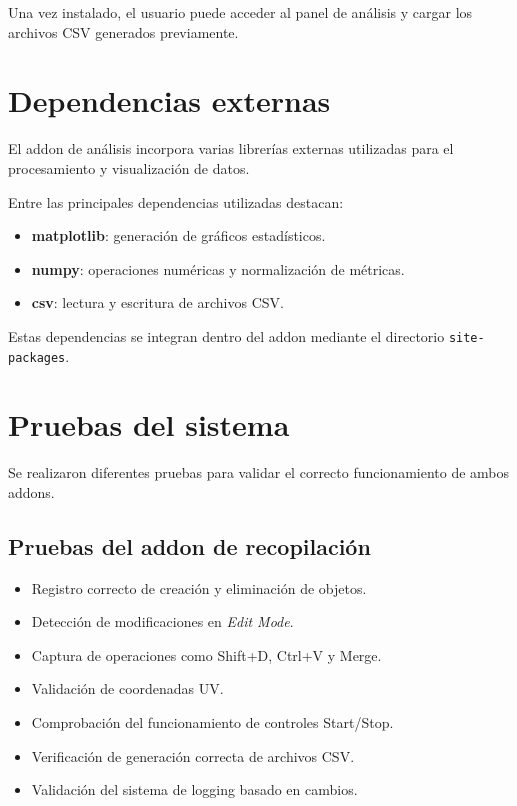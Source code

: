 Una vez instalado, el usuario puede acceder al panel de análisis y cargar los archivos CSV generados previamente.

\section{Dependencias externas}

El addon de análisis incorpora varias librerías externas utilizadas para el procesamiento y visualización de datos.

Entre las principales dependencias utilizadas destacan:

\begin{itemize}
    \item \textbf{matplotlib}: generación de gráficos estadísticos.
    \item \textbf{numpy}: operaciones numéricas y normalización de métricas.
    \item \textbf{csv}: lectura y escritura de archivos CSV.
\end{itemize}

Estas dependencias se integran dentro del addon mediante el directorio \texttt{site-packages}.

\section{Pruebas del sistema}

Se realizaron diferentes pruebas para validar el correcto funcionamiento de ambos addons.

\subsection{Pruebas del addon de recopilación}

\begin{itemize}
    \item Registro correcto de creación y eliminación de objetos.
    \item Detección de modificaciones en \textit{Edit Mode}.
    \item Captura de operaciones como Shift+D, Ctrl+V y Merge.
    \item Validación de coordenadas UV.
    \item Comprobación del funcionamiento de controles Start/Stop.
    \item Verificación de generación correcta de archivos CSV.
    \item Validación del sistema de logging basado en cambios.
\end{itemize}

